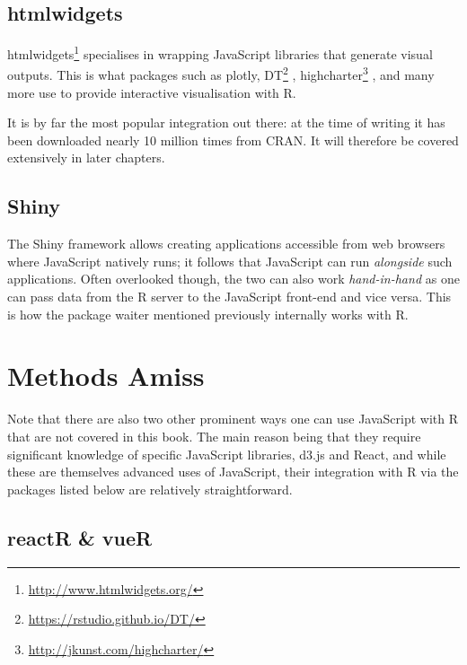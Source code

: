 \documentclass[
  10pt,
]{krantz}
\renewcommand{\href}[2]{#2\footnote{\url{#1}}}
\begin{document}
\hypertarget{intro-htmlwidgets}{%
\subsection{htmlwidgets}\label{intro-htmlwidgets}}

\href{http://www.htmlwidgets.org/}{htmlwidgets} \citep{R-htmlwidgets} specialises in wrapping JavaScript libraries that generate visual outputs. This is what packages such as plotly, \href{https://rstudio.github.io/DT/}{DT} \citep{R-DT}, \href{http://jkunst.com/highcharter/}{highcharter} \citep{R-highcharter}, and many more use to provide interactive visualisation with R.

It is by far the most popular integration out there: at the time of writing it has been downloaded nearly 10 million times from CRAN. It will therefore be covered extensively in later chapters.

\hypertarget{intro-shiny}{%
\subsection{Shiny}\label{intro-shiny}}

The Shiny framework allows creating applications accessible from web browsers where JavaScript natively runs; it follows that JavaScript can run \emph{alongside} such applications. Often overlooked though, the two can also work \emph{hand-in-hand} as one can pass data from the R server to the JavaScript front-end and vice versa. This is how the package waiter mentioned previously internally works with R.

\hypertarget{intro-amiss}{%
\section{Methods Amiss}\label{intro-amiss}}

Note that there are also two other prominent ways one can use JavaScript with R that are not covered in this book. The main reason being that they require significant knowledge of specific JavaScript libraries, d3.js and React, and while these are themselves advanced uses of JavaScript, their integration with R via the packages listed below are relatively straightforward.

\hypertarget{intro-reactr-vuer}{%
\subsection{reactR \& vueR}\label{intro-reactr-vuer}}
\end{document}
